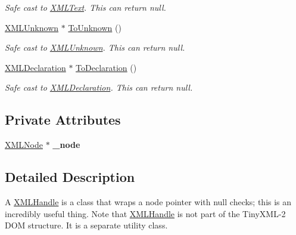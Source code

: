 \begin{DoxyCompactItemize}
\begin{DoxyCompactList}\small\item\em Safe cast to \hyperlink{classtinyxml2_1_1XMLText}{X\+M\+L\+Text}. This can return null. \end{DoxyCompactList}\item 
\hyperlink{classtinyxml2_1_1XMLUnknown}{X\+M\+L\+Unknown} $\ast$ \hyperlink{classtinyxml2_1_1XMLHandle_aa387368a1ad8d843a9f12df863d298de}{To\+Unknown} ()\hypertarget{classtinyxml2_1_1XMLHandle_aa387368a1ad8d843a9f12df863d298de}{}\label{classtinyxml2_1_1XMLHandle_aa387368a1ad8d843a9f12df863d298de}

\begin{DoxyCompactList}\small\item\em Safe cast to \hyperlink{classtinyxml2_1_1XMLUnknown}{X\+M\+L\+Unknown}. This can return null. \end{DoxyCompactList}\item 
\hyperlink{classtinyxml2_1_1XMLDeclaration}{X\+M\+L\+Declaration} $\ast$ \hyperlink{classtinyxml2_1_1XMLHandle_a108858be7ee3eb53f73b5194c1aa8ff0}{To\+Declaration} ()\hypertarget{classtinyxml2_1_1XMLHandle_a108858be7ee3eb53f73b5194c1aa8ff0}{}\label{classtinyxml2_1_1XMLHandle_a108858be7ee3eb53f73b5194c1aa8ff0}

\begin{DoxyCompactList}\small\item\em Safe cast to \hyperlink{classtinyxml2_1_1XMLDeclaration}{X\+M\+L\+Declaration}. This can return null. \end{DoxyCompactList}\end{DoxyCompactItemize}
\subsection*{Private Attributes}
\begin{DoxyCompactItemize}
\item 
\hyperlink{classtinyxml2_1_1XMLNode}{X\+M\+L\+Node} $\ast$ {\bfseries \+\_\+node}\hypertarget{classtinyxml2_1_1XMLHandle_a65449d71b75d8aeb40a54224c954c138}{}\label{classtinyxml2_1_1XMLHandle_a65449d71b75d8aeb40a54224c954c138}

\end{DoxyCompactItemize}


\subsection{Detailed Description}
A \hyperlink{classtinyxml2_1_1XMLHandle}{X\+M\+L\+Handle} is a class that wraps a node pointer with null checks; this is an incredibly useful thing. Note that \hyperlink{classtinyxml2_1_1XMLHandle}{X\+M\+L\+Handle} is not part of the Tiny\+X\+M\+L-\/2 D\+OM structure. It is a separate utility class.

